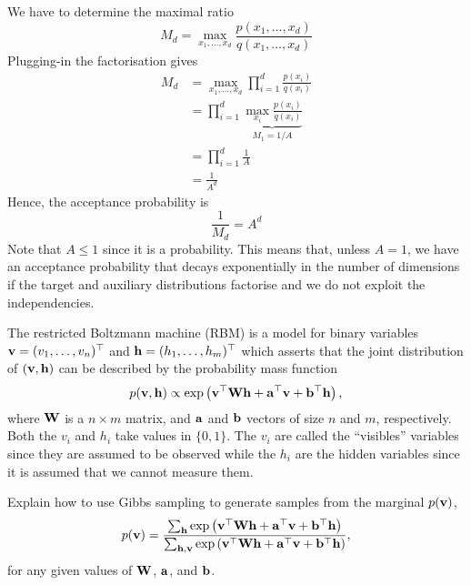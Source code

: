 \begin{exenumerate}
  \begin{solution}
    We have to determine the maximal ratio
    \begin{equation}
      M_d = \max_{x_1, \ldots, x_d} \frac{p(x_1, \ldots, x_d)}{q(x_1, \ldots, x_d)}
    \end{equation}
    Plugging-in the factorisation gives
    \begin{align}
      M_d &= \max_{x_1, \ldots, x_d} \prod_{i=1}^d \frac{p(x_i)}{q(x_i)}\\
      & = \prod_{i=1}^d \underbrace{\max_{x_i} \frac{p(x_i)}{q(x_i)}}_{M_1 = 1/A}\\
      & = \prod_{i=1}^d \frac{1}{A}\\
      & = \frac{1}{A^d}
    \end{align}
    Hence, the acceptance probability is
    \begin{equation}
      \frac{1}{M_d} = A^d
    \end{equation}
    Note that $A\le 1$ since it is a probability. This means that, unless $A=1$, we
    have an acceptance probability that decays exponentially in the
    number of dimensions if the target and auxiliary distributions
    factorise and we do not exploit the independencies.
  \end{solution}
\end{exenumerate}



The restricted Boltzmann machine (RBM) is a model for binary variables
$\mathbf{v} =(v_1, \ldots, v_n)^\top$ and $\mathbf{h}=(h_1, \ldots, h_m)^\top$ which
asserts that the joint distribution of $(\mathbf{v},\mathbf{h})$ can be described by
the probability mass function
\begin{equation}
  p(\mathbf{v},\mathbf{h}) \propto \exp\left( \mathbf{v}^\top \mathbf{W} \mathbf{h} + \mathbf{a}^\top\mathbf{v} + \mathbf{b}^\top\mathbf{h} \right),
\end{equation}
where $\mathbf{W}$ is a $n \times m$ matrix, and $\mathbf{a}$ and $\mathbf{b}$ vectors of size
$n$ and $m$, respectively. Both the $v_i$ and $h_i$ take
values in $\{0,1\}$. The $v_i$ are called the ``visibles'' variables
since they are assumed to be observed while the $h_i$ are the hidden
variables since it is assumed that we cannot measure them.

Explain how to use Gibbs sampling to generate samples from the
marginal $p(\mathbf{v})$,
  \begin{equation}
    p(\mathbf{v}) = \frac{\sum_{\mathbf{h}}  \exp\left( \mathbf{v}^\top \mathbf{W} \mathbf{h} + \mathbf{a}^\top\mathbf{v} + \mathbf{b}^\top\mathbf{h} \right)}{\sum_{\mathbf{h}, \mathbf{v}}  \exp\left( \mathbf{v}^\top \mathbf{W} \mathbf{h} + \mathbf{a}^\top\mathbf{v} + \mathbf{b}^\top\mathbf{h} \right)},
  \end{equation}
for any given values of $\mathbf{W}$, $\mathbf{a}$, and $\mathbf{b}$.

